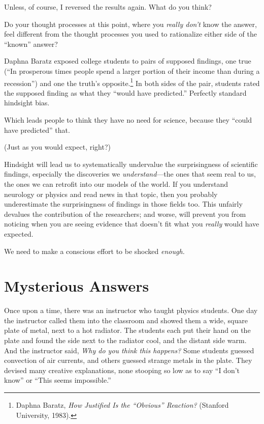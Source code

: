 {
 Unless, of course, I reversed the results again. What do you
think?}

{
 Do your thought processes at this point, where you \textit{really
don't} know the answer, feel different from the thought
processes you used to rationalize either side of the
``known'' answer?}

{
 Daphna Baratz exposed college students to pairs of supposed
findings, one true (``In prosperous times people spend
a larger portion of their income than during a
recession'') and one the truth's
opposite.\footnote{Daphna Baratz, \textit{How Justified Is the
``Obvious'' Reaction?} (Stanford
University, 1983).} In both sides of the pair, students rated
the supposed finding as what they ``would have
predicted.'' Perfectly standard hindsight bias.}

{
 Which leads people to think they have no need for science, because
they ``could have predicted'' that.}

{
 (Just as you would expect, right?)}

{
 Hindsight will lead us to systematically undervalue the
surprisingness of scientific findings, especially the discoveries we
\textit{understand}{}---the ones that seem real to us, the ones we can
retrofit into our models of the world. If you understand neurology or
physics and read news in that topic, then you probably underestimate
the surprisingness of findings in those fields too. This unfairly
devalues the contribution of the researchers; and worse, will prevent
you from noticing when you are seeing evidence that
doesn't fit what you \textit{really} would have
expected.}

{
 We need to make a conscious effort to be shocked \textit{enough.}}

\myendsectiontext


\bigskip

\chapter{Mysterious Answers}


{
 Once upon a time, there was an instructor who taught physics
students. One day the instructor called them into the classroom and
showed them a wide, square plate of metal, next to a hot radiator. The
students each put their hand on the plate and found the side next to
the radiator cool, and the distant side warm. And the instructor said,
\textit{Why do you think this happens?} Some students guessed
convection of air currents, and others guessed strange metals in the
plate. They devised many creative explanations, none stooping so low as
to say ``I don't
know'' or ``This seems
impossible.'' }

